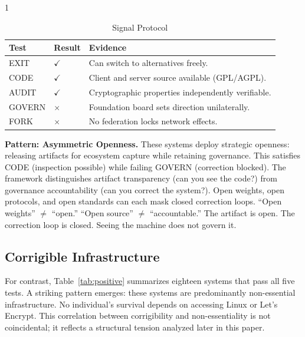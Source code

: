 \documentclass{article}
\begin{document}
\begin{table}[htbp]
    \begin{subtable}{1\textwidth}
        \centering
        \caption{Signal Protocol}
        \begin{tabular}{@{}llp{7cm}@{}}
            \toprule
            \textbf{Test} & \textbf{Result} & \textbf{Evidence} \\
            \midrule
            EXIT & $\checkmark$ & Can switch to alternatives freely. \\
            CODE & $\checkmark$ & Client and server source available (GPL/AGPL). \\
            AUDIT & $\checkmark$ & Cryptographic properties independently verifiable. \\
            GOVERN & $\times$ & Foundation board sets direction unilaterally. \\
            FORK & $\times$ & No federation locks network effects. \\
            \bottomrule
        \end{tabular}
    \end{subtable}
\end{table}

\textbf{Pattern: Asymmetric Openness.} These systems deploy strategic openness: releasing artifacts for ecosystem capture while retaining governance. This satisfies CODE (inspection possible) while failing GOVERN (correction blocked). The framework distinguishes artifact transparency (can you see the code?) from governance accountability (can you correct the system?). Open weights, open protocols, and open standards can each mask closed correction loops. ``Open weights'' $\neq$ ``open.'' ``Open source'' $\neq$ ``accountable.'' The artifact is open. The correction loop is closed. Seeing the machine does not govern it.

\subsection{Corrigible Infrastructure}

For contrast, Table~\ref{tab:positive} summarizes eighteen systems that pass all five tests. A striking pattern emerges: these systems are predominantly non-essential infrastructure. No individual's survival depends on accessing Linux or Let's Encrypt. This correlation between corrigibility and non-essentiality is not coincidental; it reflects a structural tension analyzed later in this paper.
\end{document}

